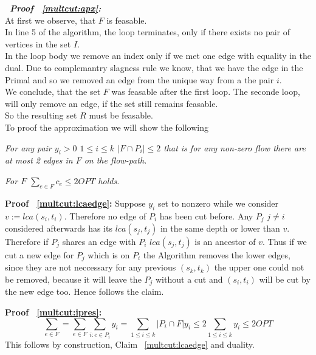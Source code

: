 \begin{description}
   \item{\bfseries\itshape~Proof ~\ref{multcut:apx}:}\\
      At first we observe, that $F$ is feasable.\\
      In line 5 of the algorithm, the loop terminates, only
      if there exists no pair of vertices in the set $I$.\\
      In the loop body we remove an index only if we met one
      edge with equality in the dual. Due to complemantry slagness rule
      we know, that we have the edge in the Primal and so we removed an
      edge from the unique way from a the pair $i$.\\
      We conclude, that the set $F$ was feasable after the first loop.
      The seconde loop, will only remove an edge, if the set still remains feasable.\\
      So the resulting set $R$ must be feasable.\\

      To proof the approximation we will show the following
      \begin{lemma}\label{multcut:lcaedge}\mdseries\itshape
         For any pair $y_i > 0$ $1\leq i \leq k$ $|F \cap P_i| \leq 2$
         that is for any non-zero flow there are at most 2 edges in $F$ on the flow-path.
      \end{lemma}

      \begin{lemma}\label{multcut:ipres}\mdseries\itshape
         For $F$  $\sum_{e \in F} c_e \leq 2OPT$ holds. 
      \end{lemma}

      \begin{description}
         \item{\bfseries Proof ~\ref{multcut:lcaedge}:}
            Suppose $y_i$ set to nonzero while we consider 
            $v := lca(s_i,t_i)$. Therefore no edge of $P_i$ has been cut before.
	         Any $P_j$ $j \neq i$ considered afterwards has its $lca(s_j,t_j)$  
            in the same depth or lower than $v$. 
            Therefore if $P_j$ shares an edge with $P_i$ $lca(s_j,t_j)$ is an ancestor of $v$. 
            Thus if we cut a new edge for $P_j$ which is on	$P_i$ the Algorithm removes the lower edges, 
            since they are not neccessary for any previous $(s_k,t_k)$ the upper one
            could not be removed, because it will leave the $P_j$ without a cut and 			
            $(s_i,t_i)$ will be cut by the new edge too. Hence follows the claim.

         \item{\bfseries Proof ~\ref{multcut:ipres}:}
	         $$ \sum_{e \in F} =\sum_{e \in F} \sum_{i : e \in P_i} 
            y_i = \sum_{1 \leq i \leq k} |P_i \cap F| y_i \leq 2 \sum_{1 \leq i \leq k} y_i \leq 2OPT$$
            This follows by construction, Claim ~\ref{multcut:lcaedge} and duality.
      \end{description}
\end{description}
